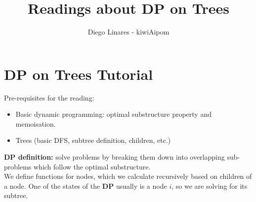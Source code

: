\documentclass{IEEEtran}
\title{Readings about DP on Trees}
\author{Diego Linares - kiwiAipom}
\begin{document}
    \maketitle

    \section{DP on Trees Tutorial}
        Pre-requisites for the reading:
        \begin{itemize}
            \item Basic dynamic programming: optimal substructure property and memoisation.
            \item Trees (basic DFS, subtree definition, children, etc.)
        \end{itemize}
        \textbf{DP definition:} solve problems by breaking them down into overlapping sub-problems which follow the optimal substructure.\\
        We define functions for nodes, which we calculate recursively based on children of a node. One of the states of the \textbf{DP} usually is a node $i$, so we are solving for its subtree.
\end{document}
